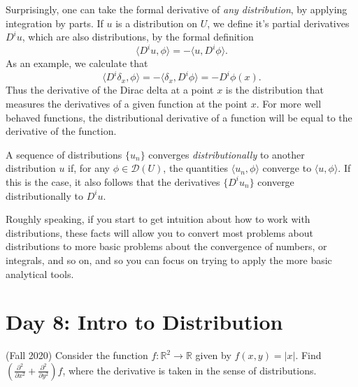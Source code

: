 \documentclass[answers]{exam}
\theoremstyle{problemstyle}
\newcommand{\1}[1]{\textbf{1}_{\left[#1\right]}} %
\def\R{\mathbb{R}} %
\begin{document}
\begin{questions}
Surprisingly, one can take the formal derivative of \emph{any distribution}, by applying integration by parts. If $u$ is a distribution on $U$, we define it's partial derivatives $D^i u$, which are also distributions, by the formal definition
%
\[ \langle D^i u, \phi \rangle = - \langle u, D^i \phi \rangle. \]
%
As an example, we calculate that
%
\[ \langle D^i \delta_x, \phi \rangle = - \langle \delta_x, D^i \phi \rangle = - D^i \phi(x). \]
%
Thus the derivative of the Dirac delta at a point $x$ is the distribution that measures the derivatives of a given function at the point $x$. For more well behaved functions, the distributional derivative of a function will be equal to the derivative of the function.

A sequence of distributions $\{ u_n \}$ converges \emph{distributionally} to another distribution $u$ if, for any $\phi \in \mathcal{D}(U)$, the quantities $\langle u_n, \phi \rangle$ converge to $\langle u, \phi \rangle$. If this is the case, it also follows that the derivatives $\{ D^i u_n \}$ converge distributionally to $D^i u$.

Roughly speaking, if you start to get intuition about how to work with distributions, these facts will allow you to convert most problems about distributions to more basic problems about the convergence of numbers, or integrals, and so on, and so you can focus on trying to apply the more basic analytical tools.







\newpage
\section{Day 8: Intro to Distribution}

\item (Fall 2020)
Consider the function $f:\R^{2}\to \R$ given by $f(x,y)=|x|$. Find $\left( \frac{\partial ^{2}}{\partial x^{2}}+ \frac{\partial ^{2}}{\partial y^{2}} \right)f$, where the derivative is taken in the sense of distributions.


\end{questions}
\end{document}
